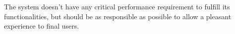 The system doesn't have any critical performance requirement to fulfill its functionalities, but should be as responsible as possible to allow a pleasant experience to final users.